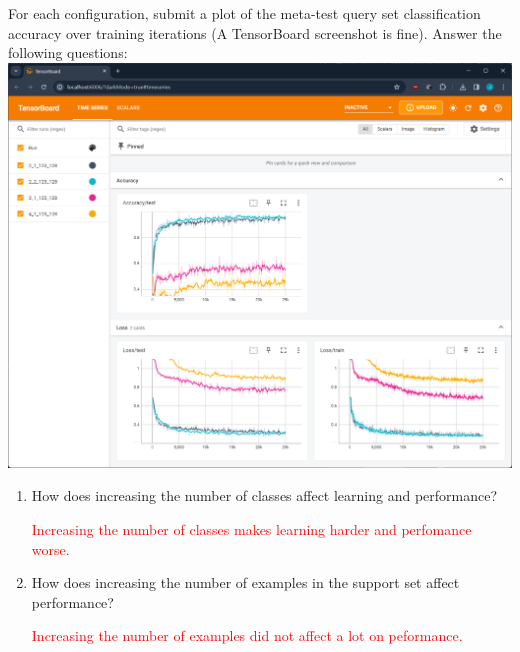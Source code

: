 \documentclass[12pt]{article}
\begin{document}
    For each configuration, submit a plot of the meta-test query set classification accuracy over training iterations (A TensorBoard screenshot is fine). Answer the following questions:
    \\
    \includegraphics[width=\linewidth]{figures/problem3.png}
    \begin{enumerate}
        \item How does increasing the number of classes affect learning and performance?

        \textcolor{red}{Increasing the number of classes makes learning harder and perfomance worse.}

        \item How does increasing the number of examples in the support set affect performance?

        \textcolor{red}{Increasing the number of examples did not affect a lot on peformance.}

    \end{enumerate}
\end{document}
